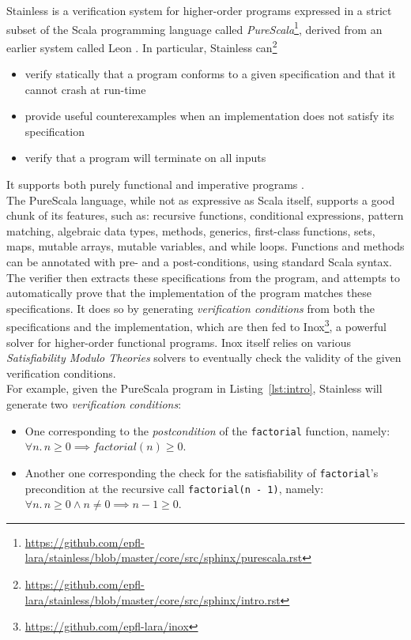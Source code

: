 \documentclass[a4paper,twoside]{article}
\newcommand{\RefCode}[1]{Listing~\ref{#1}}
\newcommand{\stt}[1]{\texttt{\small{#1}}}
\begin{document}
Stainless \cite{voirol2016automating} is a verification system for higher-order programs expressed in a strict subset of the Scala programming language called \textit{PureScala}\footnote{\url{https://github.com/epfl-lara/stainless/blob/master/core/src/sphinx/purescala.rst}}, derived from an earlier system called Leon \cite{Suter:2011:SMR:2041552.2041575}. In particular, Stainless can\footnote{\url{https://github.com/epfl-lara/stainless/blob/master/core/src/sphinx/intro.rst}}

\begin{itemize}
\item verify statically that a program conforms to a given specification and that it cannot crash at run-time
\item provide useful counterexamples when an implementation does not satisfy its specification
\item verify that a program will terminate on all inputs
\end{itemize}

It supports both purely functional and imperative programs \cite{Blanc:2013:OLV:2489837.2489838, xlang}.\\

The PureScala language, while not as expressive as Scala itself, supports a good chunk of its features, such as: recursive functions, conditional expressions, pattern matching, algebraic data types, methods, generics, first-class functions, sets, maps, mutable arrays, mutable variables, and while loops. Functions and methods can be annotated with pre- and a post-conditions, using standard Scala syntax. The verifier then extracts these specifications from the program, and attempts to automatically prove that the implementation of the program matches these specifications. It does so by generating \textit{verification conditions} from both the specifications and the implementation, which are then fed to Inox\footnote{\url{https://github.com/epfl-lara/inox}}, a powerful solver for higher-order functional programs. Inox itself relies on various \textit{Satisfiability Modulo Theories} \cite{53e486195688442995f82bfe28c55731} solvers to eventually check the validity of the given verification conditions.\\

For example, given the PureScala program in \RefCode{lst:intro}, Stainless will generate two \textit{verification conditions}:

\begin{itemize}
\item One corresponding to the \textit{postcondition} of the \stt{factorial} function, namely: $\forall n.\, n \geq 0 \implies factorial(n) \geq 0$.
\item Another one corresponding the check for the satisfiability of \stt{factorial}'s precondition at the recursive call \stt{factorial(n - 1)}, namely: $\forall n.\, n \geq 0 \wedge n \not= 0 \implies n - 1 \geq 0$.
\end{itemize}
\end{document}
